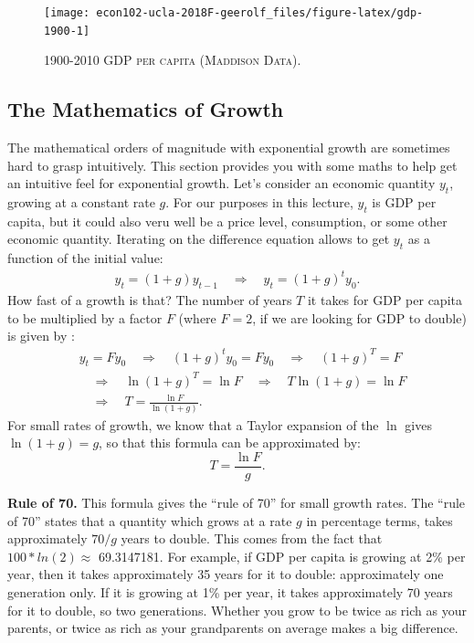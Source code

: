 \documentclass[]{book}
\begin{document}
\begin{figure}

{\centering \texttt{[image: econ102-ucla-2018F-geerolf\_files/figure-latex/gdp-1900-1]} 

}

\caption{\textsc{1900-2010 GDP per capita (Maddison Data)}.}\label{fig:gdp-1900}
\end{figure}

\subsection{The Mathematics of Growth}\label{the-mathematics-of-growth}

The mathematical orders of magnitude with exponential growth are
sometimes hard to grasp intuitively. This section provides you with some
maths to help get an intuitive feel for exponential growth. Let's
consider an economic quantity \(y_t\), growing at a constant rate \(g\).
For our purposes in this lecture, \(y_t\) is GDP per capita, but it
could also veru well be a price level, consumption, or some other
economic quantity. Iterating on the difference equation allows to get
\(y_t\) as a function of the initial value: \[
\begin{aligned}
y_t = (1+g)y_{t-1} \quad \Rightarrow \quad y_t = (1+g)^t y_0.
\end{aligned}
\] How fast of a growth is that? The number of years \(T\) it takes for
GDP per capita to be multiplied by a factor \(F\) (where \(F=2\), if we
are looking for GDP to double) is given by : \[
\begin{aligned}
&y_t = F y_0 \quad \Rightarrow \quad (1+g)^t y_0 = F y_0 \quad \Rightarrow \quad (1+g)^T = F \\
& \quad \Rightarrow \quad \ln (1+g)^T = \ln F \quad \Rightarrow \quad T \ln (1+g) = \ln F \\
& \quad \Rightarrow \quad T=\frac{\ln F}{\ln(1+g)}.
\end{aligned}
\] For small rates of growth, we know that a Taylor expansion of the
\(\ln\) gives \(\ln(1+g)=g\), so that this formula can be approximated
by: \[T = \frac{\ln F}{g}.\]

\textbf{Rule of 70.} This formula gives the ``rule of 70'' for small
growth rates. The ``rule of 70'' states that a quantity which grows at a
rate \(g\) in percentage terms, takes approximately \(70/g\) years to
double. This comes from the fact that \(100*ln(2) \approx\) 69.3147181.
For example, if GDP per capita is growing at 2\% per year, then it takes
approximately 35 years for it to double: approximately one generation
only. If it is growing at 1\% per year, it takes approximately 70 years
for it to double, so two generations. Whether you grow to be twice as
rich as your parents, or twice as rich as your grandparents on average
makes a big difference.
\end{document}
